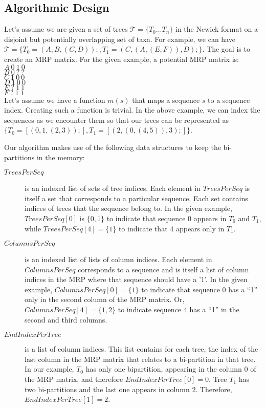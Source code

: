 \documentclass[a4paper,10pt]{article}
\begin{document}
\subsection{Algorithmic Design}
Let's assume we are given a set of trees $\mathcal{T}=\{T_0
\ldots T_n\}$ in the Newick format on a disjoint but potentially overlapping set
of taxa. For example, we can have $\mathcal{T} =
\{T_0=(A,B,(C,D));,T_1=(C,(A,(E,F)),D);\}$. The goal is to create an MRP
matrix. For the given example, a potential MRP matrix is:\\

\noindent
$A~0~1~0$\\
$B~0~?~?$\\
$C~1~0~0$\\
$D~1~0~0$\\
$E~?~1~1$\\
$F~?~1~1$\\

Let's assume we have a function $m(s)$ that maps a sequence $s$
to a sequence index. Creating such a function is trivial. In the above example,
we can index the sequences as we encounter them so that our trees can be
represented as $\{T_0=[(0,1,(2,3));],T_1=[(2,(0,(4,5)),3);]\}$.

Our algorithm makes use of the following data structures to keep the
bi-partitions in the memory:
\begin{description}
 \item[$TreesPerSeq$] is an indexed list of sets of tree indices. Each
element in $TreesPerSeq$ is itself a set that corresponds to a particular
sequence. Each set contains indices of trees that the sequence belong to. In
the given example, $TreesPerSeq[0]$ is
$\{0,1\}$ to indicate that sequence $0$ appears in $T_0$ and $T_1$, while
$TreesPerSeq[4] = \{1\}$ to indicate that $4$ appears only in $T_1$.
 \item[$ColumnsPerSeq$] is an indexed list of lists of column indices. Each
element in $ColumnsPerSeq$ corresponds to a sequence and is itself a list of
column indices in the MRP where that sequence should have a '1'. In the given
example, $ColumnsPerSeq[0]=\{1\}$ to indicate that sequence 0 has a ``1'' only
in the second column of the MRP matrix. Or, $ColumnsPerSeq[4]=\{1,2\}$ to
indicate sequence $4$ has a ``1'' in the second and third columns.
\item[$EndIndexPerTree$] is a list of column indices. This list contains for
each tree, the index of the last column in the MRP matrix that relates to a
bi-partition in that tree. In our example, $T_0$ has only one bipartition,
appearing in the column $0$ of the MRP matrix, and therefore
$EndIndexPerTree[0]=0$. Tree $T_1$ has two bi-partitions and the last one
appears in column $2$. Therefore, $EndIndexPerTree[1]=2$.
 \end{description} 
\end{document}
